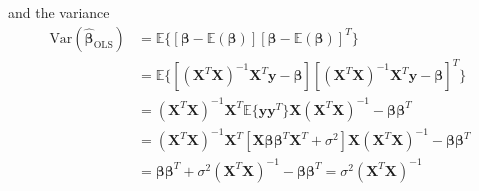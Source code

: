 \documentclass{article}
\begin{document}
	and the variance
	\begin{align*}
		\text{Var}(\hat{\bm\beta}_\text{OLS})&=\mathbb E\{ [\bm\beta-\mathbb E(\bm\beta)] [\bm\beta-\mathbb E(\bm\beta)]^T\}\\
		&=\mathbb E\{ [(\bm X^T\bm X)^{-1}\bm X^T\bm y-\bm\beta][(\bm X^T\bm X)^{-1}\bm X^T\bm y-\bm\beta]^T\}\\
		&=(\bm X^T\bm X)^{-1}\bm X^T\mathbb E\{\bm y\bm y^T\}\bm X(\bm X^T\bm X)^{-1}-\bm\beta\bm\beta^T\\
		&=(\bm X^T\bm X)^{-1}\bm X^T[\bm X\bm\beta\bm\beta^T\bm X^T+\sigma^2]\bm X(\bm X^T\bm X)^{-1}-\bm\beta\bm\beta^T\\
		&=\bm\beta\bm\beta^T+\sigma^2(\bm X^T\bm X)^{-1}-\bm\beta\bm\beta^T=\sigma^2(\bm X^T \bm X)^{-1}
	\end{align*}
	
	
\end{document}
